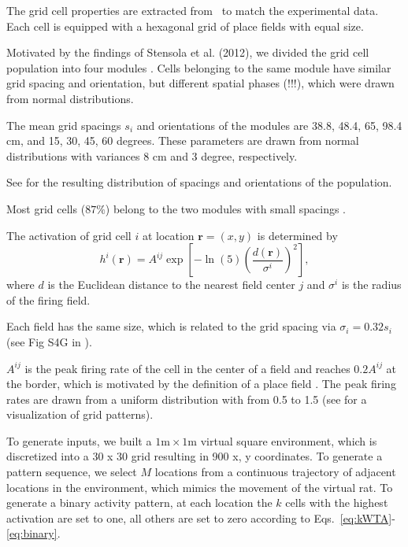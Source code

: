 \documentclass[utf8]{frontiersSCNS} %
\begin{document}
The grid cell properties are extracted from~\cite{stensola2012entorhinal} to match the experimental data.
Each cell is equipped with a hexagonal grid of place fields with equal size.

Motivated by the findings of Stensola et al. (2012), we divided the grid cell population into four modules \cite{stensola2012entorhinal}. Cells belonging to the same module have similar grid spacing and orientation, but different spatial phases (!!!), which were drawn from normal distributions. 

The mean grid spacings $s_i$ and orientations of the modules are 38.8, 48.4, 65, 98.4 cm, and 15, 30, 45, 60 degrees. These parameters are drawn from normal distributions with variances 8 cm and 3 degree, respectively.

See \cite[Fig 1B-1C]{neher2015memory} for the resulting distribution of spacings and orientations of the population.

Most grid cells ($87\%$) belong to the two modules with small spacings \cite{stensola2012entorhinal}. 

The activation of grid cell $i$ at location $\mathbf{r}=(x,y)$ is determined by
\begin{equation}
\label{eq:grid}
h^i(\mathbf{r}) = A^{ij} \exp \left[ -\ln(5) \left(\frac{d(\mathbf{r})}{\sigma^i}\right)^2 \right],
\end{equation}
where $d$ is the Euclidean distance to the nearest field center $j$ and $\sigma^i$ is the radius of the firing field.

Each field has the same size, which is related to the grid spacing via $ \sigma_i  = 0.32 s_i $ (see Fig
S4G in \cite{hafting2005microstructure}). 

$A^{ij}$ is the peak firing rate of the cell in the center of a field and reaches $0.2 A^{ij}$ at the border, which is motivated by the definition of a place field \cite{hafting2005microstructure}. The peak firing rates are drawn from a uniform distribution with from 0.5 to 1.5 (see \cite{neher2015memory} for a visualization of grid patterns).  

To generate inputs, we built a $1\textrm{m} \times 1\textrm{m}$ virtual square environment, which is discretized into a 30 x 30 grid resulting in 900 x, y coordinates.   
To generate a pattern sequence, we select $M$ locations from a continuous trajectory of adjacent locations in the environment, which mimics the movement of the virtual rat. To generate a binary activity pattern, at each location the $k$ cells with the highest activation are set to one, all others are set to zero according to Eqs.~\ref{eq:kWTA}-\ref{eq:binary}.
\end{document}
